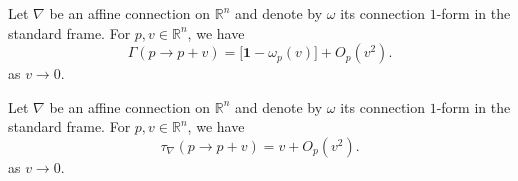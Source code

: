 \begin{lemma}
  Let $\nabla$ be an affine connection on $\mathbb{R}^n$ and denote by $\omega$ its connection $1$-form in the standard frame. For $p, v \in \mathbb{R}^n$, we have
  \begin{equation}
    \Gamma(p \to p + v) = \Big[\mathbf{1} - \omega_p(v)\Big] + O_p(v^2).
  \end{equation}
  as $v \to 0$.
\end{lemma}

\begin{lemma}
  Let $\nabla$ be an affine connection on $\mathbb{R}^n$ and denote by $\omega$ its connection $1$-form in the standard frame. For $p, v \in \mathbb{R}^n$, we have
  \begin{equation}
    \tau_\nabla(p \to p + v) = v + O_p(v^2).
  \end{equation}
  as $v \to 0$.
\end{lemma}